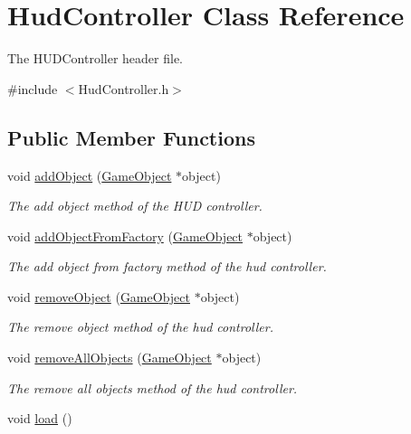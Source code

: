 \hypertarget{class_hud_controller}{\section{Hud\+Controller Class Reference}
\label{class_hud_controller}
}


The H\+U\+D\+Controller header file.  




{\ttfamily \#include $<$Hud\+Controller.\+h$>$}

\subsection*{Public Member Functions}
\begin{DoxyCompactItemize}
\item 
void \hyperlink{class_hud_controller_a27862a3db822f65de6dbcf22835ec58a}{add\+Object} (\hyperlink{class_game_object}{Game\+Object} $\ast$object)
\begin{DoxyCompactList}\small\item\em The add object method of the H\+U\+D controller. \end{DoxyCompactList}\item 
void \hyperlink{class_hud_controller_abaab3a30a47733b2588236100267e206}{add\+Object\+From\+Factory} (\hyperlink{class_game_object}{Game\+Object} $\ast$object)
\begin{DoxyCompactList}\small\item\em The add object from factory method of the hud controller. \end{DoxyCompactList}\item 
void \hyperlink{class_hud_controller_ab07bc4161257a8fbc16df56ed9dbf1ea}{remove\+Object} (\hyperlink{class_game_object}{Game\+Object} $\ast$object)
\begin{DoxyCompactList}\small\item\em The remove object method of the hud controller. \end{DoxyCompactList}\item 
void \hyperlink{class_hud_controller_aac63180083695594ae2d17278c13d604}{remove\+All\+Objects} (\hyperlink{class_game_object}{Game\+Object} $\ast$object)
\begin{DoxyCompactList}\small\item\em The remove all objects method of the hud controller. \end{DoxyCompactList}\item 
void \hyperlink{class_hud_controller_abeeed176eb5114ce613c499135c528d4}{load} ()

\end{DoxyCompactItemize}
